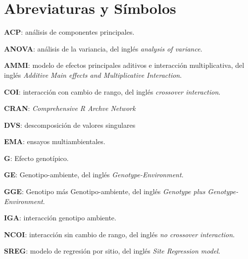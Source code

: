

\chapter*{Abreviaturas y Símbolos}
\begin{description}
\item{\textbf{ACP}}: análisis de componentes principales.

\item{\textbf{ANOVA}}: análisis de la variancia, del inglés \emph{analysis of variance}.

\item{\textbf{AMMI}}: modelo de efectos principales aditivos e interacción multiplicativa, del inglés \emph{Additive Main effects and Multiplicative Interaction}.

\item{\textbf{COI}}: interacción con cambio de rango, del inglés \emph{crossover interaction}.

\item{\textbf{CRAN}}: \emph{Comprehensive R Archve Network}

\item{\textbf{DVS}}: descomposición de valores singulares

\item{\textbf{EMA}}: ensayos multiambientales.

\item{\textbf{G}}: Efecto genotípico.

\item{\textbf{GE}}: Genotipo-ambiente, del inglés \emph{Genotype-Environment}.

\item{\textbf{GGE}}: Genotipo más Genotipo-ambiente, del inglés \emph{Genotype plus Genotype-Environment}.

\item{\textbf{IGA}}: interacción genotipo ambiente.

\item{\textbf{NCOI}}: interacción sin cambio de rango, del inglés \emph{no crossover interaction}.

\item{\textbf{SREG}}: modelo de regresión por sitio, del inglés \emph{Site Regression model}.


\end{description}

